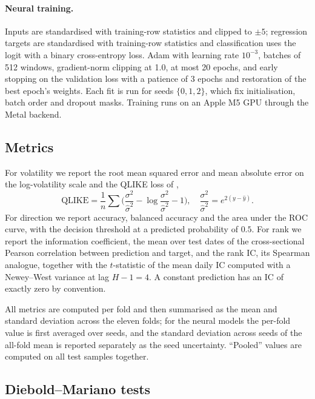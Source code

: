 \documentclass[10pt,a4paper,twoside,twocolumn]{article}
\begin{document}
\paragraph{Neural training.} Inputs are standardised with training-row statistics and clipped to $\pm 5$; regression targets are standardised with training-row statistics and classification uses the logit with a binary cross-entropy loss. Adam \citep{kingma2015adam} with learning rate $10^{-3}$, batches of 512 windows, gradient-norm clipping at 1.0, at most 20 epochs, and early stopping on the validation loss with a patience of 3 epochs and restoration of the best epoch's weights. Each fit is run for seeds $\{0,1,2\}$, which fix initialisation, batch order and dropout masks. Training runs on an Apple M5 GPU through the Metal backend.

\subsection{Metrics}

For volatility we report the root mean squared error and mean absolute error on the log-volatility scale and the QLIKE loss of \citet{patton2011volatility},
\begin{equation}
\text{QLIKE}=\frac{1}{n}\sum\Big(\frac{\sigma^2}{\hat\sigma^2}-\log\frac{\sigma^2}{\hat\sigma^2}-1\Big),\quad \frac{\sigma^2}{\hat\sigma^2}=e^{2(y-\hat y)}.
\end{equation}
For direction we report accuracy, balanced accuracy and the area under the ROC curve, with the decision threshold at a predicted probability of $0.5$. For rank we report the information coefficient, the mean over test dates of the cross-sectional Pearson correlation between prediction and target, and the rank IC, its Spearman analogue, together with the $t$-statistic of the mean daily IC computed with a Newey--West variance at lag $H-1=4$. A constant prediction has an IC of exactly zero by convention.

All metrics are computed per fold and then summarised as the mean and standard deviation across the eleven folds; for the neural models the per-fold value is first averaged over seeds, and the standard deviation across seeds of the all-fold mean is reported separately as the seed uncertainty. ``Pooled'' values are computed on all test samples together.

\subsection{Diebold--Mariano tests}\label{sec:dm}
\end{document}
